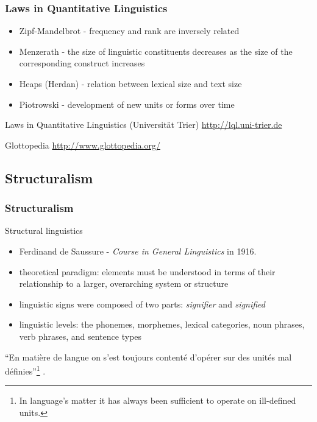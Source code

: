 \documentclass[notes]{beamer}
\begin{document}
\frame
{
  \frametitle{Laws in Quantitative Linguistics}
  \begin{itemize}
  \item Zipf-Mandelbrot - frequency and rank are inversely related
  \item Menzerath - the size of linguistic constituents decreases as the size of the corresponding construct increases
  \item Heaps (Herdan) - relation between lexical size and text size
  \item Piotrowski - development of new units or forms over time
  \end{itemize}
  
  \begin{small}
  Laws in Quantitative Linguistics (Universit\"{a}t Trier)
  \href{http://lql.uni-trier.de}{http://lql.uni-trier.de}

  Glottopedia
  \href{http://www.glottopedia.org/}{http://www.glottopedia.org/}
  \end{small}
}


\subsection{Structuralism}

\frame
{
  \frametitle{Structuralism}
  
  Structural linguistics
  \begin{itemize}
  \item Ferdinand de Saussure - \textit{Course in General Linguistics} in 1916.
  \item theoretical paradigm: elements must be understood in terms of their relationship to a larger, overarching system or structure
  \item linguistic signs were composed of two parts: \emph{signifier} and \emph{signified}
  \item linguistic levels: the phonemes, morphemes, lexical categories, noun phrases, verb phrases, and sentence types 
  \end{itemize}
  
  \vspace{0.5cm}
``En matière de langue on s’est toujours contenté d’opérer sur des unités mal définies''\footnote{In language's matter it has always been sufficient to operate on ill-defined units.} \citep{saussure}.

}
\end{document}

